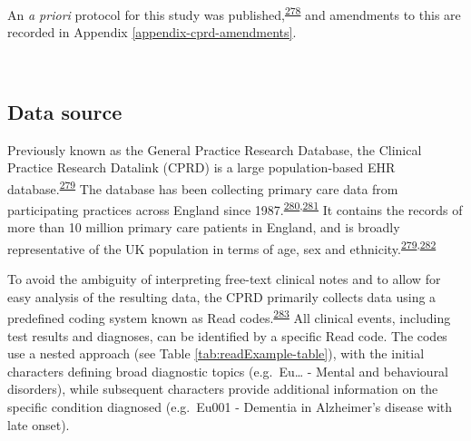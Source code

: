 \documentclass[a4paper, twoside]{templates/ociamthesis}
\begin{document}
An \emph{a priori} protocol for this study was published,\textsuperscript{\protect\hyperlink{ref-walker2016}{278}} and amendments to this are recorded in Appendix \ref{appendix-cprd-amendments}.

~

\hypertarget{cprd-data-source}{%
\subsection{Data source}\label{cprd-data-source}}

Previously known as the General Practice Research Database, the Clinical Practice Research Datalink (CPRD) is a large population-based EHR database.\textsuperscript{\protect\hyperlink{ref-herrett2015}{279}} The database has been collecting primary care data from participating practices across England since 1987.\textsuperscript{\protect\hyperlink{ref-williams2012}{280},\protect\hyperlink{ref-wood2001revitalizing}{281}} It contains the records of more than 10 million primary care patients in England, and is broadly representative of the UK population in terms of age, sex and ethnicity.\textsuperscript{\protect\hyperlink{ref-herrett2015}{279},\protect\hyperlink{ref-mathur2014}{282}}

To avoid the ambiguity of interpreting free-text clinical notes and to allow for easy analysis of the resulting data, the CPRD primarily collects data using a predefined coding system known as Read codes.\textsuperscript{\protect\hyperlink{ref-booth1994}{283}} All clinical events, including test results and diagnoses, can be identified by a specific Read code. The codes use a nested approach (see Table \ref{tab:readExample-table}), with the initial characters defining broad diagnostic topics (e.g.~Eu\ldots{} - Mental and behavioural disorders), while subsequent characters provide additional information on the specific condition diagnosed (e.g.~Eu001 - Dementia in Alzheimer's disease with late onset).

~
\end{document}
